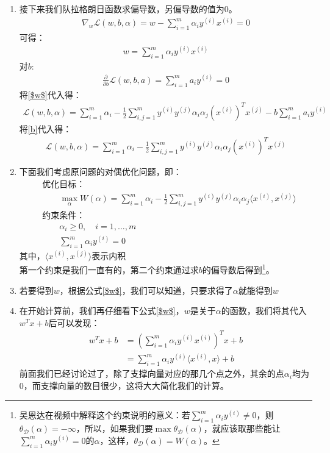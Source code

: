 \begin{enumerate}
	\item 接下来我们队拉格朗日函数求偏导数，另偏导数的值为0。
	\begin{align}
		\nabla_{w}\mathcal{L}(w,b,\alpha)=w - \sum_{i=1}^{m}\alpha_iy^{(i)}x^{(i)}=0
	\end{align}
	可得：
	\begin{align}
		w = \sum_{i=1}^{m}\alpha_iy^{(i)}x^{(i)}
		\label{$w$}
	\end{align}
	对$b$:
	\begin{align}
		\frac{\partial}{\partial b}\mathcal{L}(w,b,a) = \sum_{i=1}^{m}a_iy^{(i)}=0
		\label{b}
	\end{align}
	将\ref{$w$}代入得：
	\begin{align}
		\mathcal{L}(w,b,\alpha) = \sum_{i=1}^{m}\alpha_i-\frac{1}{2}\sum_{i,j=1}^{m}y^{(i)}y^{(j)}\alpha_i\alpha_j (x^{(i)})^Tx^{(j)} - b\sum_{i=1}^{m}a_iy^{(i)}
	\end{align}
	将\ref{b}代入得：
	\begin{align}
		\mathcal{L}(w,b,\alpha) = \sum_{i=1}^{m}\alpha_i-\frac{1}{2}\sum_{i,j=1}^{m}y^{(i)}y^{(j)}\alpha_i\alpha_j (x^{(i)})^Tx^{(j)}
	\end{align}
	\item 下面我们考虑原问题的对偶优化问题，即：
	\begin{align}
		&\text{优化目标：} \\
		& \qquad \max_{\alpha} W(\alpha) = \sum_{i=1}^{m}\alpha_i-\frac{1}{2}\sum_{i,j=1}^{m}y^{(i)}y^{(j)}\alpha_i\alpha_j \langle x^{(i)}, x^{(j)}\rangle \\
		&\text{约束条件：} \\
		& \qquad \alpha_i \geq 0, \quad i=1,\dots,m \\
		& \qquad \sum_{i=1}^{m}\alpha_iy^{(i)} = 0
	\end{align}
	其中，$\langle x^{(i)}, x^{(j)}\rangle $表示内积\\
	第一个约束是我们一直有的，第二个约束通过求$b$的偏导数后得到\footnote{吴恩达在视频中解释这个约束说明的意义：若$\sum_{i=1}^{m}\alpha_iy^{(i)} \neq 0$，则$\theta_{\mathcal{D}}(\alpha)=-\infty$，所以，如果我们要$\max \theta_{\mathcal{D}}(\alpha)$，就应该取那些能让$\sum_{i=1}^{m}\alpha_iy^{(i)} = 0$的$\alpha$，这样，$\theta_{\mathcal{D}}(\alpha)=W(\alpha)$。{\color{red}{我也没怎么懂，待后面研究研究}}}。

	\item 若要得到$w$，根据公式\ref{$w$}，我们可以知道，只要求得了$\alpha$就能得到$w$

	\item 在开始计算前，我们再仔细看下公式\ref{$w$}，$w$是关于$\alpha$的函数，我们将其代入$w^Tx+b$后可以发现：
	\begin{align}
		w^Tx + b &= \left( \sum_{i=1}^{m}\alpha_i y^{(i)}x^{(i)} \right)^Tx + b \\
		&= \sum_{i=1}^{m}\alpha_iy^{(i)}\langle x^{(i)}, x \rangle + b
	\end{align}
	前面我们已经讨论过了，除了支撑向量对应的那几个点之外，其余的点$\alpha_i$均为0，而支撑向量的数目很少，这将大大简化我们的计算。


\end{enumerate}
